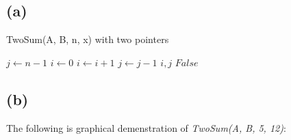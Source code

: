 \documentclass[12pt]{article}
\begin{document}
\subsection{(a)}

\begin{algorithm}
\caption{TwoSum(A, B, n, x) with two pointers}\label{TwoSum}
\begin{algorithmic}[1]
\Procedure{}{}
\State $j \gets n-1$
\State $i \gets 0$
        \State $i \gets i + 1$
        \State $j \gets j - 1$
    \Else
        \State \Return $i, j$
    \EndIf
\EndWhile
\State \Return $False$
\EndProcedure
\end{algorithmic}
\end{algorithm}


\subsection{(b)}

The following is graphical demenstration of \textit{TwoSum(A, B, 5, 12)}:
\end{document}
